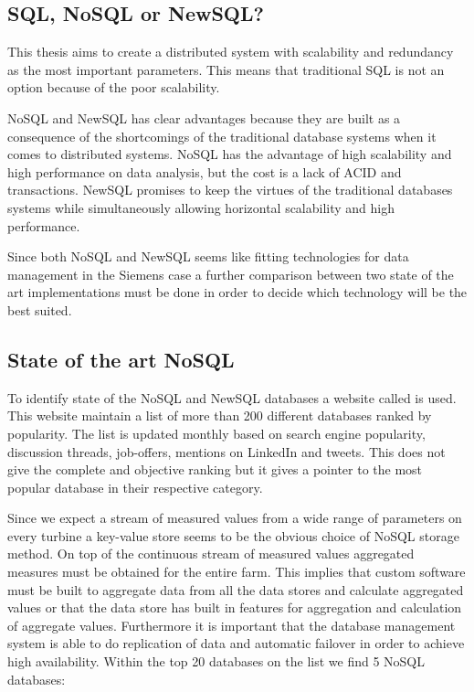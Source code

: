 \subsection{SQL, NoSQL or NewSQL?}
This thesis aims to create a distributed system with scalability and redundancy as the most important parameters.
This means that traditional SQL is not an option because of the poor scalability.

NoSQL and NewSQL has clear advantages because they are built as a consequence of the shortcomings of the traditional database systems when it comes to distributed systems.
NoSQL has the advantage of high scalability and high performance on data analysis, but the cost is a lack of ACID and transactions.
NewSQL promises to keep the virtues of the traditional databases systems while simultaneously allowing horizontal scalability and high performance.

Since both NoSQL and NewSQL seems like fitting technologies for data management in the Siemens case a further comparison between two state of the art implementations must be done in order to decide which technology will be the best suited.

\subsection{State of the art NoSQL}
To identify state of the NoSQL and NewSQL databases a website called  \cite{db-engines} is used.
This website maintain a list of more than 200 different databases ranked by popularity. The list is updated monthly based on search engine popularity, discussion threads, job-offers, mentions on LinkedIn and tweets. This does not give the complete and objective ranking but it gives a pointer to the most popular database in their respective category.

Since we expect a stream of measured values from a wide range of parameters on every turbine a key-value store seems to be the obvious choice of NoSQL storage method. On top of the continuous stream of measured values aggregated measures must be obtained for the entire farm. This implies that custom software must be built to aggregate data from all the data stores and calculate aggregated values or that the data store has built in features for aggregation and calculation of aggregate values. Furthermore it is important that the database management system is able to do replication of data and automatic failover in order to achieve high availability.
Within the top 20 databases on the list we find 5 NoSQL databases:

